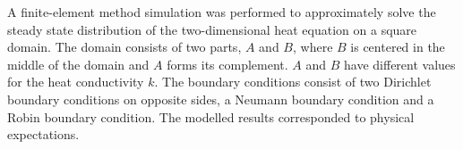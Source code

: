 A finite-element method simulation was performed to approximately solve the steady state distribution of the  two-dimensional heat equation on a square domain. The domain consists of two parts, $A$ and $B$, where $B$ is centered in the middle of the domain and $A$ forms its complement. $A$ and $B$ have different values for the heat conductivity $k$. The boundary conditions consist of two Dirichlet boundary conditions on opposite sides, a Neumann boundary condition and a Robin boundary condition. The modelled results corresponded to physical expectations.